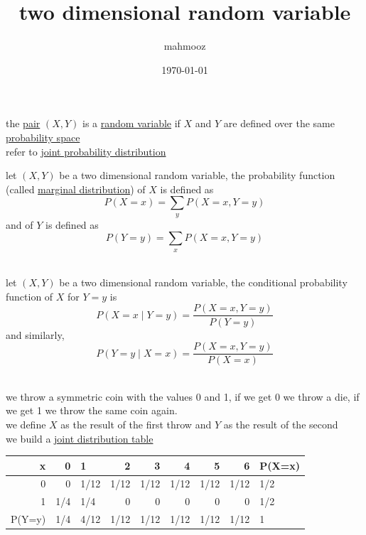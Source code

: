 \documentclass[11pt]{article}
\author{mahmooz}
\date{\today}
\title{two dimensional random variable}
\begin{document}
\maketitle
\tableofcontents

\begin{definition}
the \href{discrete_maths2.org}{pair} \((X,Y)\) is a \href{20230104221353-random_variable.org}{random variable} if \(X\) and \(Y\) are defined over the same \href{probability.org}{probability space}\\[0pt]
refer to \href{20230120140031-joint_probability_distribution.org}{joint probability distribution}\\[0pt]
\begin{characteristic}
let \((X,Y)\) be a two dimensional random variable, the probability function (called \href{20230123011904-marginal_distribution.org}{marginal distribution}) of \(X\) is defined as \[ P(X=x)=\sum_{y} P(X=x,Y=y) \] and of \(Y\) is defined as \[P(Y=y)=\sum_{x} P(X=x,Y=y)\]\\[0pt]
\end{characteristic}
\begin{characteristic}
let \((X,Y)\) be a two dimensional random variable, the conditional probability function of \(X\) for \(Y=y\) is \[ P(X=x\mid Y=y)=\frac{P(X=x,Y=y)}{P(Y=y)} \] and similarly, \[ P(Y=y\mid X=x)=\frac{P(X=x,Y=y)}{P(X=x)} \]\\[0pt]
\end{characteristic}
\begin{my_example}
we throw a symmetric coin with the values 0 and 1, if we get 0 we throw a die, if we get 1 we throw the same coin again.\\[0pt]
we define \(X\) as the result of the first throw and \(Y\) as the result of the second\\[0pt]
we build a \href{20230123141739-joint_probability_table.org}{joint distribution table}\\[0pt]
\begin{center}
\begin{tabular}{rrlrrrrrl}
x\y & 0 & 1 & 2 & 3 & 4 & 5 & 6 & P(X=x)\\[0pt]
\hline
0 & 0 & 1/12 & 1/12 & 1/12 & 1/12 & 1/12 & 1/12 & 1/2\\[0pt]
1 & 1/4 & 1/4 & 0 & 0 & 0 & 0 & 0 & 1/2\\[0pt]
P(Y=y) & 1/4 & 4/12 & 1/12 & 1/12 & 1/12 & 1/12 & 1/12 & 1\\[0pt]
\end{tabular}
\end{center}

\end{my_example}
\end{definition}
\end{document}
